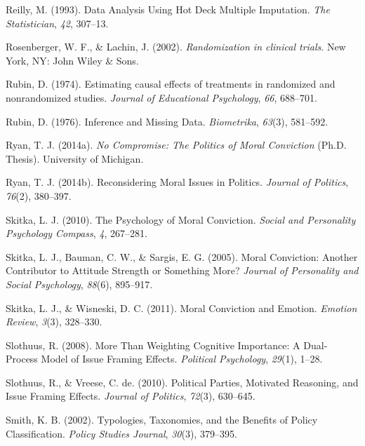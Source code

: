 \documentclass[12pt,econ]{sources/authesis}
\begin{document}
\leavevmode\hypertarget{ref-reilly_1993_data}{}%
Reilly, M. (1993). Data Analysis Using Hot Deck Multiple Imputation. \emph{The Statistician}, \emph{42}, 307--13.

\leavevmode\hypertarget{ref-rosenberger_2002_randomization}{}%
Rosenberger, W. F., \& Lachin, J. (2002). \emph{Randomization in clinical trials}. New York, NY: John Wiley \& Sons.

\leavevmode\hypertarget{ref-rubin_1974_estimating}{}%
Rubin, D. (1974). Estimating causal effects of treatments in randomized and nonrandomized studies. \emph{Journal of Educational Psychology}, \emph{66}, 688--701.

\leavevmode\hypertarget{ref-rubin_1976_inference}{}%
Rubin, D. (1976). Inference and Missing Data. \emph{Biometrika}, \emph{63}(3), 581--592.

\leavevmode\hypertarget{ref-ryan_no_2014}{}%
Ryan, T. J. (2014a). \emph{No Compromise: The Politics of Moral Conviction} (Ph.D. Thesis). University of Michigan.

\leavevmode\hypertarget{ref-ryan_reconsidering_2014}{}%
Ryan, T. J. (2014b). Reconsidering Moral Issues in Politics. \emph{Journal of Politics}, \emph{76}(2), 380--397.

\leavevmode\hypertarget{ref-skitka_psychology_2010}{}%
Skitka, L. J. (2010). The Psychology of Moral Conviction. \emph{Social and Personality Psychology Compass}, \emph{4}, 267--281.

\leavevmode\hypertarget{ref-skitka_moral_2005}{}%
Skitka, L. J., Bauman, C. W., \& Sargis, E. G. (2005). Moral Conviction: Another Contributor to Attitude Strength or Something More? \emph{Journal of Personality and Social Psychology}, \emph{88}(6), 895--917.

\leavevmode\hypertarget{ref-skitka_moral_2011}{}%
Skitka, L. J., \& Wisneski, D. C. (2011). Moral Conviction and Emotion. \emph{Emotion Review}, \emph{3}(3), 328--330.

\leavevmode\hypertarget{ref-slothuus_more_2008}{}%
Slothuus, R. (2008). More Than Weighting Cognitive Importance: A Dual-Process Model of Issue Framing Effects. \emph{Political Psychology}, \emph{29}(1), 1--28.

\leavevmode\hypertarget{ref-slothuus_political_2010}{}%
Slothuus, R., \& Vreese, C. de. (2010). Political Parties, Motivated Reasoning, and Issue Framing Effects. \emph{Journal of Politics}, \emph{72}(3), 630--645.

\leavevmode\hypertarget{ref-smith_typologies_2002}{}%
Smith, K. B. (2002). Typologies, Taxonomies, and the Benefits of Policy Classification. \emph{Policy Studies Journal}, \emph{30}(3), 379--395.
\end{document}

